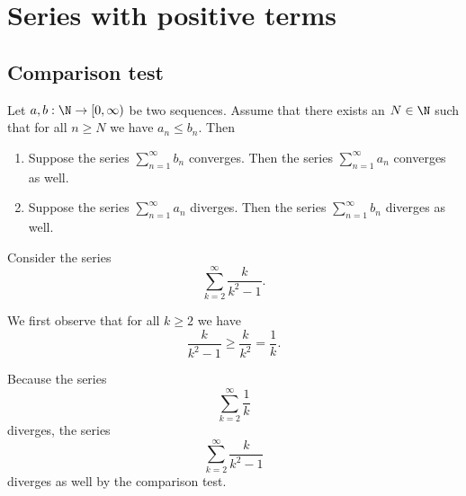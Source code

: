 \section{Series with positive terms}

\subsection{Comparison test}
\begin{theorem}
    Let $a,b: \N \to [0, \infty)$ be two sequences. Assume that there exists an $N \in \N$ such that for all $n \ge N$ we have $a_n \le b_n$. Then
    \begin{enumerate}
        \item Suppose the series $\sum_{n=1}^\infty b_n$ converges. Then the series $\sum_{n=1}^\infty a_n$ converges as well.
        \item Suppose the series $\sum_{n=1}^\infty a_n$ diverges. Then the series $\sum_{n=1}^\infty b_n$ diverges as well.
    \end{enumerate}
\end{theorem}
\begin{example}
    Consider the series
    $$\sum_{k=2}^{\infty}\frac{k}{k^2-1}.$$

    We first observe that for all $k \ge 2$ we have
    $$\frac{k}{k^2-1} \ge \frac{k}{k^2} = \frac{1}{k}.$$

    Because the series
    $$\sum_{k=2}^{\infty}\frac{1}{k}$$
    diverges, the series
    $$\sum_{k=2}^{\infty}\frac{k}{k^2-1}$$
    diverges as well by the comparison test.
\end{example}

